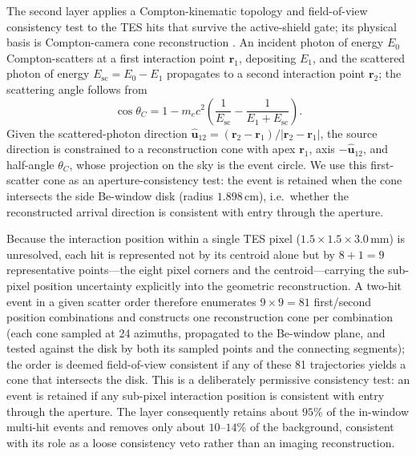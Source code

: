 \documentclass[11pt]{article}
\begin{document}
The second layer applies a Compton-kinematic topology and field-of-view
consistency test to the TES hits that survive the active-shield gate; its
physical basis is Compton-camera cone reconstruction \cite{Zoglauer2006}. An
incident photon of energy $E_0$ Compton-scatters at a first interaction point
$\mathbf r_1$, depositing $E_1$, and the scattered photon of energy
$E_{\mathrm{sc}}=E_0-E_1$ propagates to a second interaction point $\mathbf r_2$;
the scattering angle follows from
\begin{equation}
  \cos\theta_C =
  1 - m_ec^2\left(\frac{1}{E_{\mathrm{sc}}}
  - \frac{1}{E_1+E_{\mathrm{sc}}}\right).
\end{equation}
Given the scattered-photon direction
$\hat{\mathbf u}_{12}=(\mathbf r_2-\mathbf r_1)/|\mathbf r_2-\mathbf r_1|$, the
source direction is constrained to a reconstruction cone with apex $\mathbf r_1$,
axis $-\hat{\mathbf u}_{12}$, and half-angle $\theta_C$, whose projection on the
sky is the event circle. We use this first-scatter cone as an aperture-consistency
test: the event is retained when the cone intersects the side Be-window disk (radius
$1.898\,\mathrm{cm}$), i.e.\ whether the reconstructed arrival direction is
consistent with entry through the aperture.

Because the interaction position within a single TES pixel
($1.5\times1.5\times3.0\,\mathrm{mm}$) is unresolved, each hit is represented not
by its centroid alone but by $8+1=9$ representative points---the eight pixel
corners and the centroid---carrying the sub-pixel position uncertainty
explicitly into the geometric reconstruction. A two-hit event in a given scatter
order therefore enumerates $9\times9=81$ first/second position combinations and
constructs one reconstruction cone per combination (each cone sampled at 24
azimuths, propagated to the Be-window plane, and tested against the disk by both
its sampled points and the connecting segments); the order is deemed
field-of-view consistent if any of these 81 trajectories yields a cone that
intersects the disk. This is a deliberately permissive consistency test: an
event is retained if any sub-pixel interaction position is consistent with entry
through the aperture. The layer consequently retains about $95\%$ of the
in-window multi-hit events and removes only about $10$--$14\%$ of the background,
consistent with its role as a loose consistency veto rather than an imaging
reconstruction.
\end{document}
